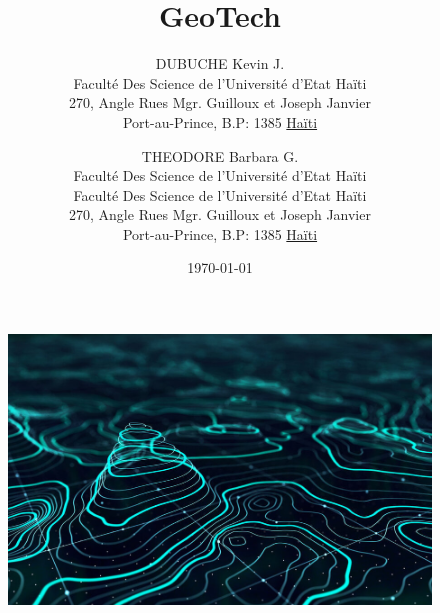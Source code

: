 \documentclass[a4paper,12pt]{report}
\begin{document}
\begin{figure}[t]
        \centering
        \includegraphics[width=1\textwidth]{GIS}
        \label{image-GIS}
        \end{figure}

\title{GeoTech}
\author{
        DUBUCHE Kevin J. \\
        Faculté Des Science de l'Université d'Etat Haïti\\
        270, Angle Rues Mgr. Guilloux et Joseph Janvier\\
        Port-au-Prince, B.P: 1385 \underline{Haïti}
        \and
        THEODORE Barbara G.\\
        Faculté Des Science de l'Université d'Etat Haïti\\
        Faculté Des Science de l'Université d'Etat Haïti\\
        270, Angle Rues Mgr. Guilloux et Joseph Janvier \\
        Port-au-Prince, B.P: 1385  \underline{Haïti}
}
\date{\today}
\maketitle

\tableofcontents
\newpage
{}













\end{document}
